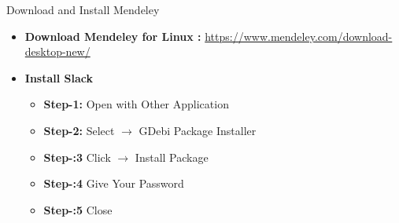 \begin{frame}[t]{Download and Install Mendeley}
	\begin{itemize}
		\item \textbf{Download Mendeley for Linux :} 
		\url{https://www.mendeley.com/download-desktop-new/}
		\item \textbf{Install Slack} 
		\begin{itemize}
			\item \textbf{Step-1:}  Open with Other Application 
			\item \textbf{Step-2:}  Select $\rightarrow$ GDebi Package Installer
			\item \textbf{Step-:3}  Click $\rightarrow$ Install Package 
			\item \textbf{Step-:4}  Give Your Password 
			\item \textbf{Step-:5}  Close 
		\end{itemize}
	\end{itemize}
\end{frame}




